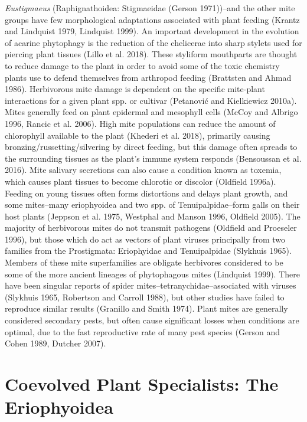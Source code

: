 \documentclass[12pt,final,CPage]{ufthesis}
\begin{document}
{\emph{Eustigmaeus} (Raphignathoidea: Stigmaeidae (Gerson 1971))--and the other mite groups have few morphological adaptations associated with plant feeding (Krantz and Lindquist 1979, Lindquist 1999). An important development in the evolution of acarine phytophagy is the reduction of the chelicerae into sharp stylets used for piercing plant tissues (Lillo et al. 2018). These styliform mouthparts are thought to reduce damage to the plant in order to avoid some of the toxic chemistry plants use to defend themselves from arthropod feeding (Brattsten and Ahmad 1986). Herbivorous mite damage is dependent on the specific mite-plant interactions for a given plant spp. or cultivar (Petanović and Kielkiewicz 2010a). Mites generally feed on plant epidermal and mesophyll cells (McCoy and Albrigo 1996, Rancic et al. 2006). High mite populations can reduce the amount of chlorophyll available to the plant (Khederi et al. 2018), primarily causing bronzing/russetting/silvering by direct feeding, but this damage often spreads to the surrounding tissues as the plant's immune system responds (Bensoussan et al. 2016). Mite salivary secretions can also cause a condition known as toxemia, which causes plant tissues to become chlorotic or discolor (Oldfield 1996a). Feeding on young tissues often forms distortions and delays plant growth, and some mites--many eriophyoidea and two spp. of Tenuipalpidae--form galls on their host plants (Jeppson et al. 1975, Westphal and Manson 1996, Oldfield 2005). The majority of herbivorous mites do not transmit pathogens (Oldfield and Proeseler 1996), but those which do act as vectors of plant viruses principally from two families from the Prostigmata: Eriophyidae and Tenuipalpidae (Slykhuis 1965). Members of these mite superfamilies are obligate herbivores considered to be some of the more ancient lineages of phytophagous mites (Lindquist 1999). There have been singular reports of spider mites--tetranychidae--associated with viruses (Slykhuis 1965, Robertson and Carroll 1988), but other studies have failed to reproduce similar results (Granillo and Smith 1974). Plant mites are generally considered secondary pests, but often cause significant losses when conditions are optimal, due to the fast reproductive rate of many pest species (Gerson and Cohen 1989, Dutcher 2007).

  \hypertarget{erios-litrev}{%
  \section{Coevolved Plant Specialists: The Eriophyoidea}\label{erios-litrev}}

}
\end{document}
